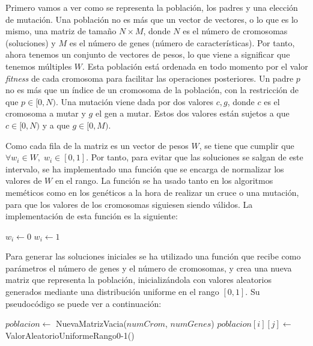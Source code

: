 \documentclass[11pt,a4paper]{article}
\begin{document}
Primero vamos a ver como se representa la población, los padres y una elección de mutación. Una población no es más que un
vector de vectores, o lo que es lo mismo, una matriz de tamaño $N \times M$, donde $N$ es el número de cromosomas (soluciones)
y $M$ es el número de genes (número de características). Por tanto, ahora tenemos un conjunto de vectores de pesos, lo que
viene a significar que tenemos múltiples $W$. Esta población está ordenada en todo momento por el valor \textit{fitness}
de cada cromosoma para facilitar las operaciones posteriores. Un padre $p$ no es más que un índice de un cromosoma de la
población, con la restricción de que $p \in [0, N)$. Una mutación viene dada por dos valores $c, g$, donde $c$ es el cromosoma
a mutar y $g$ el gen a mutar. Estos dos valores están sujetos a que $c \in [0, N)$ y a que $g \in [0, M)$.

Como cada fila de la matriz es un vector de pesos $W$, se tiene que cumplir que $\forall w_i \in W, \; w_i \in [0, 1]$. Por
tanto, para evitar que las soluciones se salgan de este intervalo, se ha implementado una función que se encarga de normalizar
los valores de $W$ en el rango. La función se ha usado tanto en los algoritmos meméticos como en los genéticos a
la hora de realizar un cruce o una mutación, para que los valores de los cromosomas siguiesen siendo válidos. La
implementación de esta función es la siguiente:

\begin{algorithm}[H]
\caption{Función que normaliza un vector de pesos $W$}
\begin{algorithmic}[1]
		\State $w_i \gets 0$
		\State $w_i \gets 1$
	\EndIf
\EndFor
\State {}
\EndFunction
\end{algorithmic}
\end{algorithm}

Para generar las soluciones iniciales se ha utilizado una función que recibe como parámetros el número de genes y el número de
cromosomas, y crea una nueva matriz que representa la población, inicializándola con valores aleatorios generados
mediante una distribución uniforme en el rango $[0, 1]$. Su pseudocódigo se puede ver a continuación:

\begin{algorithm}[H]
\caption{Función que genera una población inicial}
\begin{algorithmic}[1]
\State $poblacion \gets $ NuevaMatrizVacia($numCrom$, $numGenes$)
			\State $poblacion[i][j] \gets $ ValorAleatorioUniformeRango0-1()
		\EndFor	
	\EndFor
\State {}
\EndFunction
\end{algorithmic}
\end{algorithm}
\end{document}
